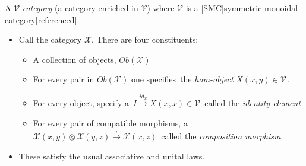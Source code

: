 
A $\mathcal{V}$ \emph{category} (a category enriched in $\mathcal{V}$) where $\mathcal{V}$ is a \ref{SMC|symmetric monoidal category|referenced}.

\begin{itemize}
    \item Call the category $\mathcal{X}$. There are four constituents:
          \begin{itemize}
            \item A collection of objects, $Ob(\mathcal{X})$
            \item For every pair in $Ob(\mathcal{X})$ one specifies \,the \emph{hom-object} $X(x,y) \in \mathcal{V}$\,.
            \item For every object, specify a \,$I \xrightarrow{id_x}X(x,x) \in \mathcal{V}$\, called the \emph{identity element}
            \item For every pair of compatible morphisms, a \,$\mathcal{X}(x,y)\otimes\mathcal{X}(y,z)\xrightarrow{;}\mathcal{X}(x,z)$\, called the \emph{composition morphism}.
          \end{itemize}
    \item These satisfy the usual associative and unital laws.

  \end{itemize}

